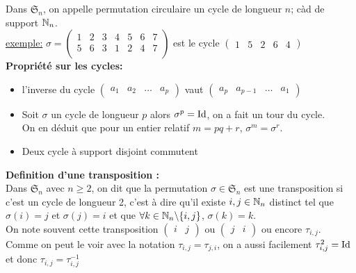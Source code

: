 Dans $\mathfrak{S}_n$, on appelle permutation circulaire un cycle de longueur $n$; càd de support $\mathbb{N}_n$.\\

\underline{exemple:} $\sigma=\begin{pmatrix}
	1 &2 &3 &4 &5 &6 &7\\
	5 &6 & 3 & 1 & 2& 4 & 7\\
\end{pmatrix}$ est le cycle $\begin{pmatrix}
1&5&2&6&4
\end{pmatrix}$\\

\textbf{Propriété sur les cycles:}\\
\begin{itemize}
	\item l'inverse du cycle $\begin{pmatrix}
		a_1&a_2&\dots &a_p
	\end{pmatrix}$ vaut $\begin{pmatrix}
	a_p&a_{p-1}&\dots &a_1
\end{pmatrix}$\\
	\item Soit $\sigma$ un cycle de longueur $p$ alors $\sigma^p=\operatorname{Id}$, on a fait un tour du cycle.\\
On en déduit que pour un entier relatif $m=pq+r$, $\sigma^m=\sigma^r$.\\
\item Deux cycle à support disjoint commutent
\end{itemize}

\textbf{Definition d'une transposition :}\\
Dans $\mathfrak{S}_n$ avec $n\geq 2$, on dit que la permutation $\sigma\in\mathfrak{S}_n$ est une transposition si c'est un cycle de longueur 2, c'est à dire qu'il existe $i,j\in\mathbb{N}_n$ distinct tel que $\sigma(i)=j$ et $\sigma(j)=i$ et que $\forall k\in\mathbb{N}_n\backslash\{i,j\}$, $\sigma(k)=k$.\\
On note souvent cette transposition $\begin{pmatrix}
	i & j
\end{pmatrix}$ ou $\begin{pmatrix}
j & i
\end{pmatrix}$ ou encore $\tau_{i,j}$.\\
Comme on peut le voir avec la notation $\tau_{i,j}=\tau_{j,i}$, on a aussi facilement $\tau^2_{i,j}=\operatorname{Id}$ et donc $\tau_{i,j}=\tau^{-1}_{i,j}$\\

